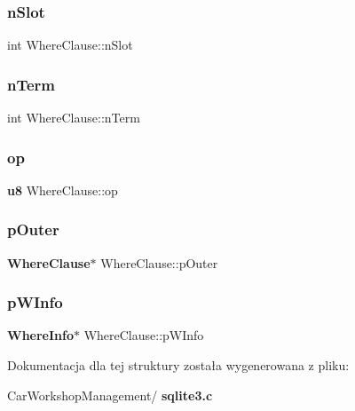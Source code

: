\mbox{\label{struct_where_clause_ac92b93d65d4c3d9216707a049a4edb1c}} 
\subsubsection{nSlot}
{\footnotesize\ttfamily int Where\+Clause\+::n\+Slot}

\mbox{\label{struct_where_clause_ab84924c3c78af1ab387ab3919c5031c4}} 
\subsubsection{nTerm}
{\footnotesize\ttfamily int Where\+Clause\+::n\+Term}

\mbox{\label{struct_where_clause_a7a56a5fe1ab6603e930f3b5372ff2f71}} 
\subsubsection{op}
{\footnotesize\ttfamily \textbf{ u8} Where\+Clause\+::op}

\mbox{\label{struct_where_clause_a6f72d61f416a323f39a8d3e2be62f607}} 
\subsubsection{pOuter}
{\footnotesize\ttfamily \textbf{ Where\+Clause}$\ast$ Where\+Clause\+::p\+Outer}

\mbox{\label{struct_where_clause_a40045b5806b481237c7fc4c0e21cd29b}} 
\subsubsection{pWInfo}
{\footnotesize\ttfamily \textbf{ Where\+Info}$\ast$ Where\+Clause\+::p\+W\+Info}



Dokumentacja dla tej struktury została wygenerowana z pliku\+:\begin{DoxyCompactItemize}
\item 
Car\+Workshop\+Management/\textbf{ sqlite3.\+c}\end{DoxyCompactItemize}
